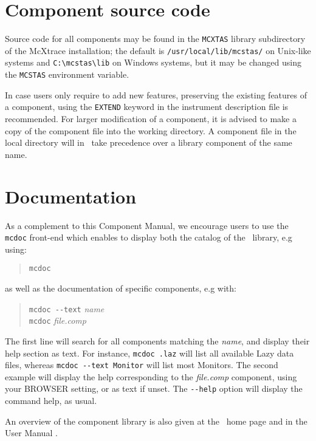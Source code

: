 \section{Component source code}
Source code for all components may be found in the \verb+MCXTAS+ library
subdirectory of the McXtrace installation;
the default is \verb+/usr/local/lib/mcstas/+
on Unix-like systems and \verb+C:\mcstas\lib+ on Windows systems, but it may be
changed using the \verb+MCSTAS+ environment variable.

In case users only require to add new features, preserving the existing features of a component, 
using the \verb+EXTEND+ keyword in the instrument description file is recommended. For larger modification of a component, it is advised to make a copy
of the component file into the working directory.
A component file in the local directory will in \MCX\ take precedence over
a library component of the same name.

\section{Documentation}
As a complement to this Component Manual, we encourage users to use
the \verb+mcdoc+ front-end which enables to display both the
catalog of the \MCX\ library, e.g using: 
\begin{quote}
  \verb|mcdoc|
\end{quote}
as well as the documentation of specific components, e.g with:
\begin{quote}
  \verb|mcdoc --text| {\it name} \\
  \verb|mcdoc| {\it file.comp}
\end{quote}
The first line will search for all components matching the {\it name},
and display their help section as text. For instance, \verb+mcdoc .laz+ will list all available Lazy data files, whereas \verb+mcdoc --text Monitor+ will list most Monitors.
The second example will display the help corresponding to
the {\it file.comp} component, using your
BROWSER setting, or as text if unset.
The \verb+--help+ option will display the command help, as usual.

An overview of the component library is also given at the \MCX\ home page \cite{mcstas_webpage} and in the User Manual \cite{mcstasmanual}.

